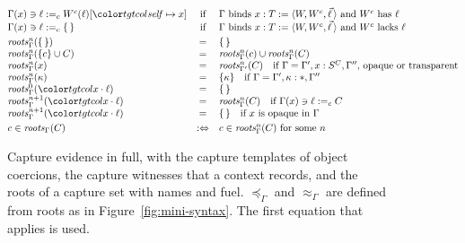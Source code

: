 \begin{figure}[tp]
\[
\begin{array}{@{}lcl@{}}
\Gamma(x) \ni \ell \mathrel{:=_{c}} W^{c}(\ell)[\self \mapsto x] & \text{if} & \Gamma \text{ binds } x : T \mathrel{:=} \langle W, W^{c}, \vec{\ell}\,\rangle \text{ and } W^{c} \text{ has } \ell \\
\Gamma(x) \ni \ell \mathrel{:=_{c}} \cempty & \text{if} & \Gamma \text{ binds } x : T \mathrel{:=} \langle W, W^{c}, \vec{\ell}\,\rangle \text{ and } W^{c} \text{ lacks } \ell \\[3pt]
\rootsn{\Gamma}{n}{\cempty} & = & \cempty \\
\rootsn{\Gamma}{n}{\cset{c} \cup C} & = & \rootsn{\Gamma}{n}{c} \cup \rootsn{\Gamma}{n}{C} \\
\rootsn{\Gamma}{n}{x} & = & \rootsn{\Gamma'}{n}{C} \quad \text{if } \Gamma = \Gamma', x : \capt{S}{C}, \Gamma'' \text{, opaque or transparent} \\
\rootsn{\Gamma}{n}{\kappa} & = & \cset{\kappa} \quad \text{if } \Gamma = \Gamma', \kappa : \cstar, \Gamma'' \\
\rootsn{\Gamma}{0}{\sel{x}{\ell}} & = & \cempty \\
\rootsn{\Gamma}{n+1}{\sel{x}{\ell}} & = & \rootsn{\Gamma}{n}{C} \quad \text{if } \Gamma(x) \ni \ell \mathrel{:=_{c}} C \\
\rootsn{\Gamma}{n+1}{\sel{x}{\ell}} & = & \cempty \quad \text{if } x \text{ is opaque in } \Gamma \\[3pt]
c \in \roots{\Gamma}{C} & :\Leftrightarrow & c \in \rootsn{\Gamma}{n}{C} \text{ for some } n
\end{array}
\]
\color{black}
\caption{Capture evidence in full, with the capture templates of object coercions, the capture witnesses that a context records, and the roots of a capture set with names and fuel. $\preccurlyeq_\Gamma$ and $\approx_\Gamma$ are defined from roots as in Figure~\ref{fig:mini-syntax}. The first equation that applies is used.}
\label{fig:target-capev}
\end{figure}

